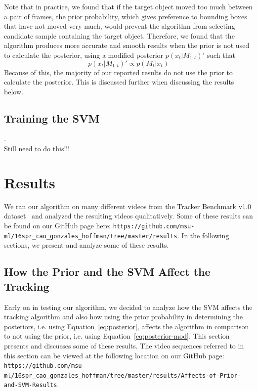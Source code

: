 \documentclass{sig-alternate-05-2015}
\newcommand{\todo}{{\\ \huge \color{red} Still need to do this!!!}} %
\begin{document}
Note that in practice, we found that if the target object moved too much between a pair of frames, the prior probability, which gives preference to bounding boxes that have not moved very much, would prevent the algorithm from selecting candidate sample containing the target object.
Therefore, we found that the algorithm produces more accurate and smooth results when the prior is not used to calculate the posterior, using a modified posterior $p(x_t|M_{1:t})'$ such that
\begin{equation}
\label{eq:posterior-mod}
p(x_t|M_{1:t})' \propto p(M_t |x_t)
\end{equation}
Because of this, the majority of our reported results do not use the prior to calculate the posterior.
This is discussed further when discussing the results below.

\subsection{Training the SVM}
\label{sec:training-svm} %
-
\todo

\section{Results}
We ran our algorithm on many different videos from the Tracker Benchmark v1.0 dataset~\cite{wu2013online} and analyzed the resulting videos qualitatively.
Some of these results can be found on our GitHub page here: \verb!https://github.com/msu-ml/16spr_cao_gonzales_hoffman/tree/master/results!.
In the following sections, we present and analyze some of these results.

\subsection{How the Prior and the SVM Affect the Tracking}
Early on in testing our algorithm, we decided to analyze how the SVM affects the tracking algorithm and also how using the prior probability in determining the posteriors, i.e. using Equation~\ref{eq:posterior}, affects the algorithm in comparison to not using the prior, i.e. using Equation~\ref{eq:posterior-mod}.
This section presents and discusses some of these results.
The video sequences referred to in this section can be viewed at the following location on our GitHub page: \verb!https://github.com/msu-ml/16spr_cao_gonzales_hoffman/tree/master/results/Affects-of-Prior-and-SVM-Results!.
\end{document}
